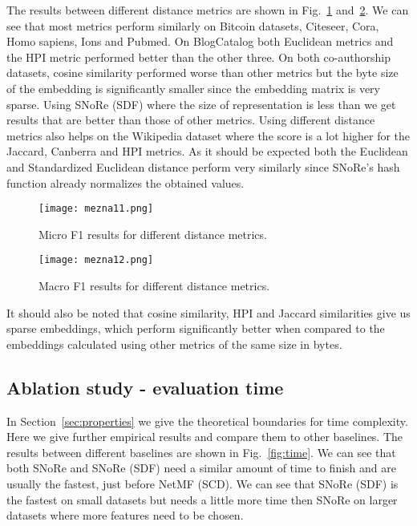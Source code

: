 \documentclass[twoside,11pt]{article}
\begin{document}
The results between different distance metrics are shown in Fig.~\ref{fig:micrometric} and~\ref{fig:macrometric}. We can see that most metrics perform similarly on Bitcoin datasets, Citeseer, Cora, Homo sapiens, Ions and Pubmed. On BlogCatalog both Euclidean metrics and the HPI metric performed better than the other three. On both co-authorship datasets, cosine similarity performed worse than other metrics but the byte size of the embedding is significantly smaller since the embedding matrix is very sparse. Using SNoRe (SDF) where the size of representation is less than  we get results that are better than those of other metrics. Using different distance metrics also helps on the Wikipedia dataset where the score is a lot higher for the Jaccard, Canberra and HPI metrics. As it should be expected both the Euclidean and Standardized Euclidean distance perform very similarly since SNoRe's hash function already normalizes the obtained values.

\begin{figure}[t!]
  \centering
  \texttt{[image: mezna11.png]}
  \caption{Micro F1 results for different distance metrics.}
  \label{fig:micrometric}
\end{figure}

\begin{figure}[t!]
  \centering
  \texttt{[image: mezna12.png]}
  \caption{Macro F1 results for different distance metrics.}
  \label{fig:macrometric}
\end{figure}

It should also be noted that cosine similarity, HPI and Jaccard similarities give us sparse embeddings, which perform significantly better when compared to the embeddings calculated using other metrics of the same size in bytes.

\subsection{Ablation study - evaluation time}
\label{sec:eval-times}
In Section~\ref{sec:properties} we give the theoretical boundaries for time complexity. Here we give further empirical results and compare them to other baselines. The results between different baselines are shown in Fig.~\ref{fig:time}. We can see that both SNoRe and SNoRe (SDF) need a similar amount of time to finish and are usually the fastest, just before NetMF (SCD). We can see that SNoRe (SDF) is the fastest on small datasets but needs a little more time then SNoRe on larger datasets where more features need to be chosen.
\end{document}
